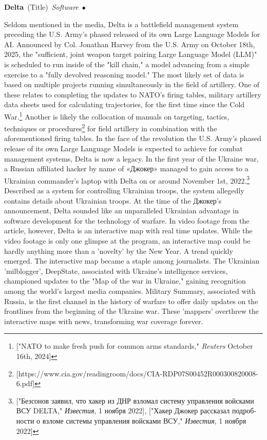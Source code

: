 \documentclass[10pt,a4paper,twoside]{article} %
\newcommand{\entry}[4]{\markboth{#1}{#1}\textbf{#1}\ {(#2)}\ \textit{#3}\ $\bullet$\ {#4}}  %
\begin{document}
\begin{multicols}{2}

\entry{Delta} {Title} {Software} {Seldom mentioned in the media, Delta is a battlefield management system preceding the U.S. Army's phased released of its own Large Language Models for AI. Announced by Col. Jonathan Harvey from the U.S. Army on October 18th, 2025, the "sufficient, joint weapon target pairing Large Language Model (LLM)" is scheduled to run inside of the "kill chain," a model advancing from a simple exercise to a "fully devolved reasoning model." The most likely set of data is based on multiple projects running simultaneously in the field of artillery. One of these relates to completing the updates to NATO's firing tables, military artillery data sheets used for calculating trajectories, for the first time since the Cold War.\footnote{["NATO to make fresh push for common arms standards," \emph{Reuters} October 16th, 2024]} Another is likely the collocation of manuals on targeting, tactics, techniques or procedures\footnote{[https://www.cia.gov/readingroom/docs/CIA-RDP07S00452R000300820008-6.pdf]} for field artillery in combination with the aforementioned firing tables. In the face of the revolution the U.S. Army's phased release of its own Large Language Models is expected to achieve for combat management systems, Delta is now a legacy. 
\indent In the first year of the Ukraine war, a Russian affiliated hacker by name of \textrussian{«Джокер»} managed to gain access to a Ukrainian commander's laptop with Delta on or around November 1st, 2022.\footnote{["\textrussian{Безсонов заявил, что хакер из ДНР взломал систему управления войсками ВСУ DELTA},"  \textukrainian{\emph{Известия}}, 1 \textrussian{ноября} 2022], ["\textrussian{Хакер Джокер рассказал подробности о взломе системы управления войсками ВСУ},"  \textukrainian{\emph{Известия}}, 1 \textrussian{ноября} 2022] } Described as a system for controlling Ukrainian troops, the system allegedly contains details about Ukrainian troops. At the time of the \textrussian{Джокер}'s announcement, Delta sounded like an unparalleled Ukrainian advantage in software development for the technology of warfare. In video footage from the article, however, Delta is an interactive map with real time updates. While the video footage is only one glimpse at the program, an interactive map could be hardly anything more than a 'novelty' by the New Year. A trend quickly emerged. The interactive map became a staple among journalists. The Ukrainian 'milblogger', DeepState, associated with Ukraine's intelligence services, championed updates to the "Map of the war in Ukraine," gaining recognition among the world's largest media companies. Military Summary, associated with Russia, is the first channel in the history of warfare to offer daily updates on the frontlines from the beginning of the Ukraine war. These 'mappers' overthrew the interactive maps with news, transforming war coverage forever. 

}
\end{multicols}
\end{document}
